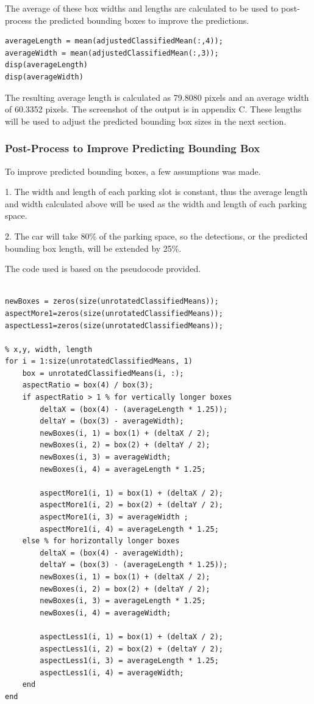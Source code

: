 \documentclass[man]{apa7}
\begin{document}
The average of these box widths and lengths are calculated to be used to post-process the predicted bounding boxes to improve the predictions.

\begin{lstlisting}[]
averageLength = mean(adjustedClassifiedMean(:,4));
averageWidth = mean(adjustedClassifiedMean(:,3));
disp(averageLength)
disp(averageWidth)
\end{lstlisting}

The resulting average length is calculated as 79.8080 pixels and an average width of 60.3352 pixels. The screenshot of the output is in appendix C. These lengths will be used to adjust the predicted bounding box sizes in the next section. 

\subsubsection{Post-Process to Improve Predicting Bounding Box}

To improve predicted bounding boxes, a few assumptions was made. 

1. The width and length of each parking slot is constant, thus the average length and width calculated above will be used as the width and length of each parking space.

2. The car will take 80\% of the parking space, so the detections, or the predicted bounding box length, will be extended by 25\%.

The code used is based on the pseudocode provided.

\begin{lstlisting}[]

newBoxes = zeros(size(unrotatedClassifiedMeans));
aspectMore1=zeros(size(unrotatedClassifiedMeans));
aspectLess1=zeros(size(unrotatedClassifiedMeans));

% x,y, width, length
for i = 1:size(unrotatedClassifiedMeans, 1)
    box = unrotatedClassifiedMeans(i, :);
    aspectRatio = box(4) / box(3);
    if aspectRatio > 1 % for vertically longer boxes
        deltaX = (box(4) - (averageLength * 1.25));
        deltaY = (box(3) - averageWidth);
        newBoxes(i, 1) = box(1) + (deltaX / 2);
        newBoxes(i, 2) = box(2) + (deltaY / 2);
        newBoxes(i, 3) = averageWidth;
        newBoxes(i, 4) = averageLength * 1.25;

        aspectMore1(i, 1) = box(1) + (deltaX / 2);
        aspectMore1(i, 2) = box(2) + (deltaY / 2);
        aspectMore1(i, 3) = averageWidth ;
        aspectMore1(i, 4) = averageLength * 1.25;
    else % for horizontally longer boxes
        deltaX = (box(4) - averageWidth);
        deltaY = (box(3) - (averageLength * 1.25));
        newBoxes(i, 1) = box(1) + (deltaX / 2);
        newBoxes(i, 2) = box(2) + (deltaY / 2);
        newBoxes(i, 3) = averageLength * 1.25;
        newBoxes(i, 4) = averageWidth;

        aspectLess1(i, 1) = box(1) + (deltaX / 2);
        aspectLess1(i, 2) = box(2) + (deltaY / 2);
        aspectLess1(i, 3) = averageLength * 1.25;
        aspectLess1(i, 4) = averageWidth;
    end
end

\end{lstlisting}
\end{document}
